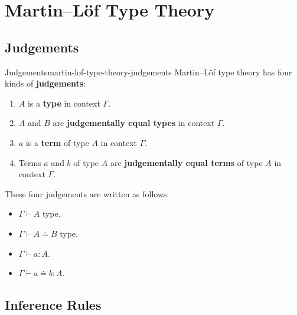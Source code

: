 \section{Martin--Löf Type Theory}\label{section-martin-lof-type-theory}
\subsection{Judgements}\label{subsection-martin-lof-type-theory-judgements}
\begin{definition}{Judgements}{martin-lof-type-theory-judgements}%
    Martin--Löf type theory has four kinds of \textbf{judgements}:
    \begin{enumerate}
        \item\label{martin-lof-type-theory-being-a-type}$A$ is a \textbf{type} in context $\Gamma$.
        \item\label{martin-lof-type-theory-being-judgementally-equal-types}$A$ and $B$ are \textbf{judgementally equal types} in context $\Gamma$.
        \item\label{martin-lof-type-theory-being-a-term}$a$ is a \textbf{term} of type $A$ in context $\Gamma$.
        \item\label{martin-lof-type-theory-being-judgementally-equal-terms}Terms $a$ and $b$ of type $A$ are \textbf{judgementally equal terms} of type $A$ in context $\Gamma$.
    \end{enumerate}
    These four judgements are written as follows:
    \begin{itemize}
        \item $\Gamma\vdash A$ type.
        \item $\Gamma\vdash A\doteq B$ type.
        \item $\Gamma\vdash a:A$.
        \item $\Gamma\vdash a\doteq b:A$.
    \end{itemize}
\end{definition}
\subsection{Inference Rules}\label{subsection-martin-lof-type-theory-inference-rules}
\begin{appendices}

\end{appendices}

